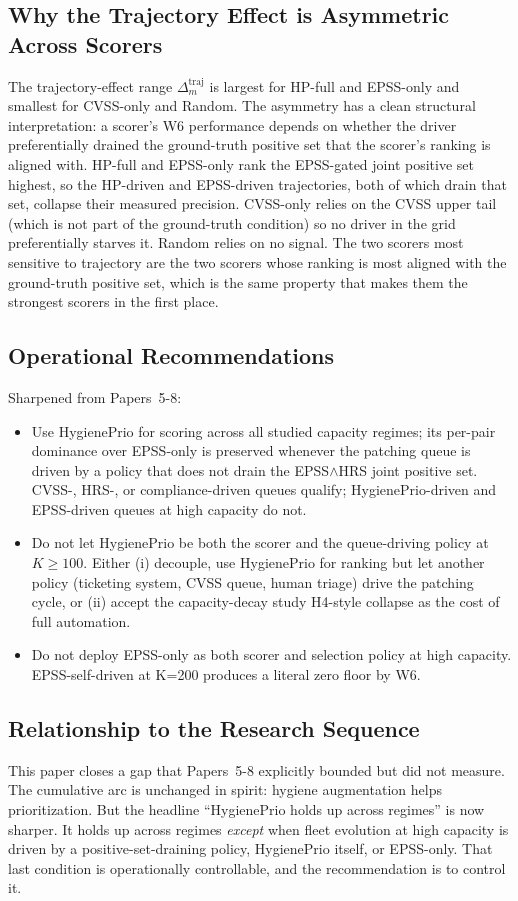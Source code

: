 \subsection{Why the Trajectory Effect is Asymmetric Across Scorers}

The trajectory-effect range $\Delta^{\mathrm{traj}}_m$ is largest for
HP-full and EPSS-only and smallest for CVSS-only and Random. The
asymmetry has a clean structural interpretation: a scorer's W6
performance depends on whether the driver preferentially drained the
ground-truth positive set that the scorer's ranking is aligned with.
HP-full and EPSS-only rank the EPSS-gated joint positive set highest,
so the HP-driven and EPSS-driven trajectories, both of which drain
that set, collapse their measured precision. CVSS-only relies on
the CVSS upper tail (which is not part of the ground-truth condition)
so no driver in the grid preferentially starves it. Random relies on
no signal. The two scorers most sensitive to trajectory are the two
scorers whose ranking is most aligned with the ground-truth positive
set, which is the same property that makes them the strongest
scorers in the first place.

\subsection{Operational Recommendations}

Sharpened from Papers~5-8:
\begin{itemize}
\item Use HygienePrio for scoring across all studied capacity
regimes; its per-pair dominance over EPSS-only is preserved
whenever the patching queue is driven by a policy that does not
drain the EPSS$\wedge$HRS joint positive set. CVSS-, HRS-, or
compliance-driven queues qualify; HygienePrio-driven and
EPSS-driven queues at high capacity do not.
\item Do not let HygienePrio be both the scorer and the queue-driving
policy at $K \geq 100$. Either (i) decouple, use HygienePrio
for ranking but let another policy (ticketing system, CVSS queue,
human triage) drive the patching cycle, or (ii) accept the capacity-decay study
H4-style collapse as the cost of full automation.
\item Do not deploy EPSS-only as both scorer and selection policy at
high capacity. EPSS-self-driven at K=200 produces a literal zero
floor by W6.
\end{itemize}

\subsection{Relationship to the Research Sequence}

This paper closes a gap that Papers~5-8 explicitly bounded but did
not measure. The cumulative arc is unchanged in spirit: hygiene
augmentation helps prioritization. But the headline ``HygienePrio
holds up across regimes'' is now sharper. It holds up across regimes
\textit{except} when fleet evolution at high capacity is driven by a
positive-set-draining policy, HygienePrio itself, or EPSS-only.
That last condition is operationally
controllable, and the recommendation is to control it.
